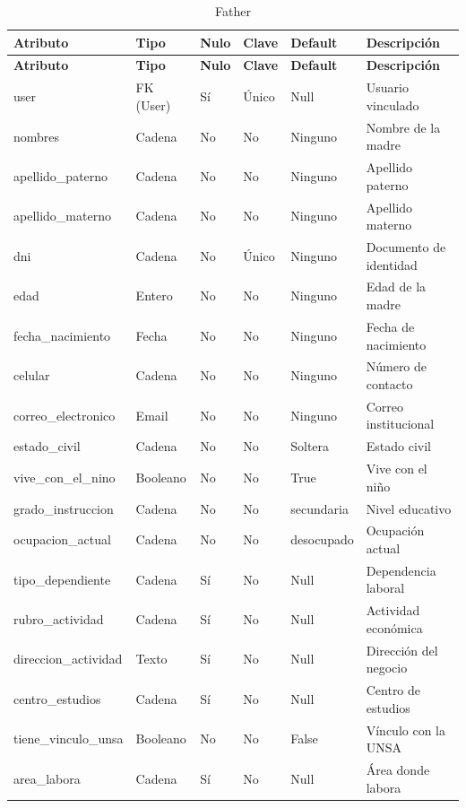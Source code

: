 \documentclass{article}
\begin{document}
\begin{longtable}{|l|l|l|l|l|l|}
\caption{Father} \\
\hline
\rowcolor{tabledictionariesbackground}
\textbf{Atributo} & \textbf{Tipo} & \textbf{Nulo} & \textbf{Clave} & \textbf{Default} & \textbf{Descripción} \\
\hline
\endfirsthead
\hline
\rowcolor{tabledictionariesbackground}
\textbf{Atributo} & \textbf{Tipo} & \textbf{Nulo} & \textbf{Clave} & \textbf{Default} & \textbf{Descripción} \\
\hline
\endhead
user & FK (User) & Sí & Único & Null & Usuario vinculado \\
nombres & Cadena & No & No & Ninguno & Nombre de la madre \\
apellido\_paterno & Cadena & No & No & Ninguno & Apellido paterno \\
apellido\_materno & Cadena & No & No & Ninguno & Apellido materno \\
dni & Cadena & No & Único & Ninguno & Documento de identidad \\
edad & Entero & No & No & Ninguno & Edad de la madre \\
fecha\_nacimiento & Fecha & No & No & Ninguno & Fecha de nacimiento \\
celular & Cadena & No & No & Ninguno & Número de contacto \\
correo\_electronico & Email & No & No & Ninguno & Correo institucional \\
estado\_civil & Cadena & No & No & Soltera & Estado civil \\
vive\_con\_el\_nino & Booleano & No & No & True & Vive con el niño \\
grado\_instruccion & Cadena & No & No & secundaria & Nivel educativo \\
ocupacion\_actual & Cadena & No & No & desocupado & Ocupación actual \\
tipo\_dependiente & Cadena & Sí & No & Null & Dependencia laboral \\
rubro\_actividad & Cadena & Sí & No & Null & Actividad económica \\
direccion\_actividad & Texto & Sí & No & Null & Dirección del negocio \\
centro\_estudios & Cadena & Sí & No & Null & Centro de estudios \\
tiene\_vinculo\_unsa & Booleano & No & No & False & Vínculo con la UNSA \\
area\_labora & Cadena & Sí & No & Null & Área donde labora \\

\end{longtable}
\end{document}
